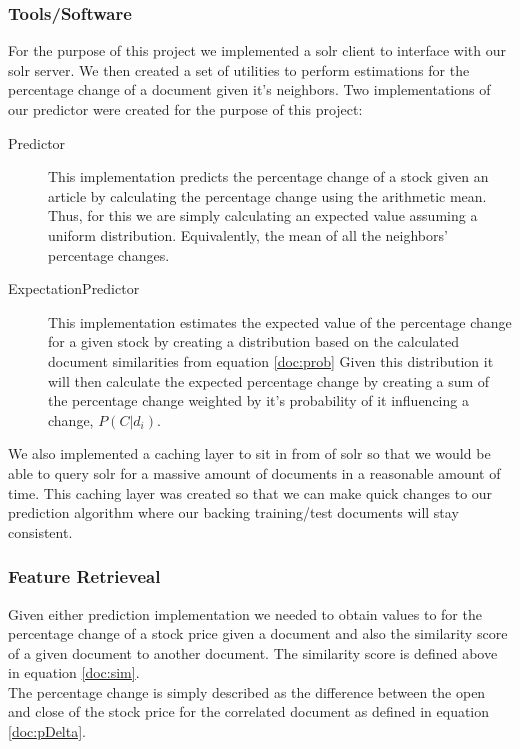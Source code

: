 \documentclass[11pt,letterpaper]{article}
\begin{document}
\subsubsection{Tools/Software}
For the purpose of this project we implemented a solr client to
interface with our solr server. We then created a set of utilities to
perform estimations for the percentage change of a document given it's
neighbors. Two implementations of our predictor were created for the
purpose of this project:
\begin{description}
	\item[Predictor]
	 This implementation predicts the percentage change of a stock given an
   article by calculating the percentage change using the arithmetic mean.
   Thus, for this we are simply calculating an expected value assuming a
   uniform distribution. Equivalently, the mean of all the neighbors' percentage changes.
	 \item[ExpectationPredictor]
	 This implementation estimates the expected value of the percentage change
   for a given stock by creating a distribution based on the
   calculated document similarities from equation \eqref{doc:prob}
	 Given this distribution it will then calculate the expected percentage
   change by creating a sum of the percentage change weighted by
   it's probability of it influencing a change, \(P(C | d_i)\).
\end{description}
We also implemented a caching layer to sit in from of solr so that we would
be able to query solr for a massive amount of documents in a reasonable
amount of time. This caching layer was created so that we can make quick
changes to our prediction algorithm where our backing training/test documents will stay consistent.

\subsubsection{Feature Retrieveal}
Given either prediction implementation we needed to obtain values to for the
percentage change of a stock price given a document and also the similarity
score of a given document to another document. The similarity score
is defined above in equation \eqref{doc:sim}. \\
The percentage change is simply described as the difference between the open
and close of the stock price for the correlated document as defined in equation \eqref{doc:pDelta}.
\end{document}
